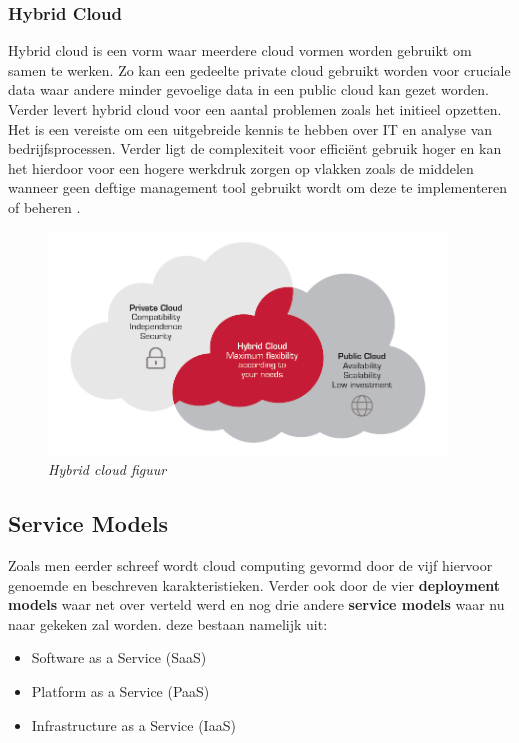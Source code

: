 \subsubsection{Hybrid Cloud}

Hybrid cloud is een vorm waar meerdere cloud vormen worden gebruikt om samen te werken. Zo kan een gedeelte private cloud gebruikt worden voor cruciale data waar andere minder gevoelige data in een public cloud kan gezet worden. Verder levert hybrid cloud voor een aantal problemen zoals het initieel opzetten. Het is een vereiste om een uitgebreide kennis te hebben over IT en analyse van bedrijfsprocessen. Verder ligt de complexiteit voor efficiënt gebruik hoger en kan het hierdoor voor een hogere werkdruk zorgen op vlakken zoals de middelen wanneer geen deftige management tool gebruikt wordt om deze te implementeren of beheren \autocite{Boris2020hybrid}. 

\begin{figure}[htbp]
\centerline{\includegraphics[width=400]{bachproef/img/hybridCloud.png}}
\caption{\textit{Hybrid cloud figuur \autocite{Boris2020hybrid}}}
\label{fig}
\end{figure}
\newpage
\subsection{Service Models}
\label{sec:Service models}

Zoals men eerder schreef wordt cloud computing gevormd door de vijf hiervoor genoemde en beschreven karakteristieken. Verder ook door de vier \textbf{deployment models} waar net over verteld werd en nog drie andere \textbf{service models} waar nu naar gekeken zal worden. deze bestaan namelijk uit:

\begin{itemize}
    \item Software as a Service (SaaS)
    \item Platform as a Service (PaaS)
    \item Infrastructure as a Service (IaaS)
\end{itemize}


